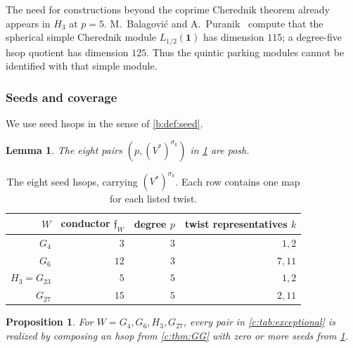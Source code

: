 \documentclass[11pt]{amsart}
\newtheorem{proposition}[theorem]{Proposition}
\newtheorem{lemma}[theorem]{Lemma}
\theoremstyle{definition}
\begin{document}
The need for constructions beyond the coprime Cherednik theorem
already appears in $H_3$ at $p=5$. M.~Balagovi\'c and A.~Puranik~\cite[Theorem 10.1]{BalagovicPuranik} compute
that the spherical simple Cherednik module $L_{1/2}(\mathbf1)$ has
dimension $115$; a degree-five
hsop quotient has dimension $125$. Thus the quintic parking modules
cannot be identified with that simple module.

\subsubsection{Seeds and coverage}\label{c:sec:noncoprime}

We use seed hsops in the sense of \cref{b:def:seed}.

\begin{lemma}\label{c:lem:seeds}
The eight pairs $(p,(V^*)^{\sigma_k})$ in \cref{tab:seeds} are posh.
\end{lemma}

\begin{table}[htbp]
\centering
\begin{tabular}{@{}rrrr@{}}
\toprule
$W$ & conductor $\mathfrak f_W$ & degree $p$ & twist representatives $k$\\
\midrule
$G_4$ & $3$ & $3$ & $1,2$\\
$G_6$ & $12$ & $3$ & $7,11$\\
$H_3=G_{23}$ & $5$ & $5$ & $1,2$\\
$G_{27}$ & $15$ & $5$ & $2,11$\\
\bottomrule
\end{tabular}
\caption{The eight seed hsops, carrying $(V^*)^{\sigma_k}$.
Each row contains one map for each listed twist.}\label{tab:seeds}
\end{table}

\begin{proposition}\label{c:prop:seed-coverage}
For $W=G_4,G_6,H_3,G_{27}$, every pair in
\cref{c:tab:exceptional} is realized by composing an hsop from
\cref{c:thm:GG} with zero or more seeds from \cref{c:lem:seeds}.
\end{proposition}
\end{document}
